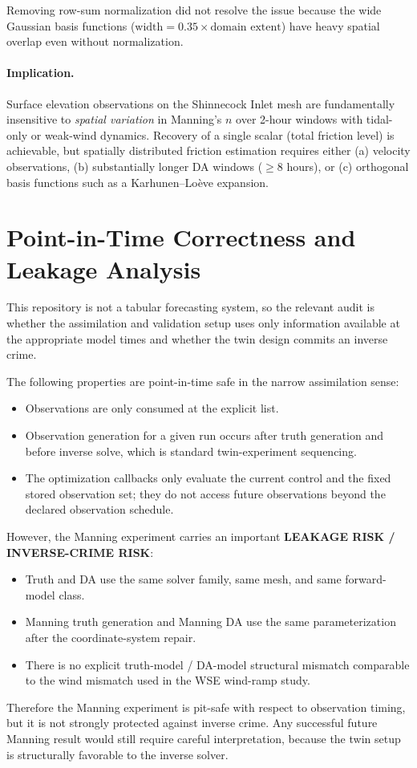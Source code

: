 \documentclass[11pt]{article}
\begin{document}
Removing row-sum normalization did not resolve the issue because the wide Gaussian basis functions ($\text{width} = 0.35 \times \text{domain extent}$) have heavy spatial overlap even without normalization.

\paragraph{Implication.} Surface elevation observations on the Shinnecock Inlet mesh are fundamentally insensitive to \emph{spatial variation} in Manning's $n$ over 2-hour windows with tidal-only or weak-wind dynamics. Recovery of a single scalar (total friction level) is achievable, but spatially distributed friction estimation requires either (a) velocity observations, (b) substantially longer DA windows ($\ge 8$ hours), or (c) orthogonal basis functions such as a Karhunen--Lo\`eve expansion.

\section{Point-in-Time Correctness and Leakage Analysis}
This repository is not a tabular forecasting system, so the relevant audit is whether the assimilation and validation setup uses only information available at the appropriate model times and whether the twin design commits an inverse crime.

The following properties are point-in-time safe in the narrow assimilation sense:
\begin{itemize}
\item Observations are only consumed at the explicit  list.
\item Observation generation for a given run occurs after truth generation and before inverse solve, which is standard twin-experiment sequencing.
\item The optimization callbacks only evaluate the current control and the fixed stored observation set; they do not access future observations beyond the declared observation schedule.
\end{itemize}

However, the Manning experiment carries an important \textbf{LEAKAGE RISK / INVERSE-CRIME RISK}:
\begin{itemize}
\item Truth and DA use the same solver family, same mesh, and same forward-model class.
\item Manning truth generation and Manning DA use the same  parameterization after the coordinate-system repair.
\item There is no explicit truth-model / DA-model structural mismatch comparable to the wind mismatch used in the WSE wind-ramp study.
\end{itemize}
Therefore the Manning experiment is pit-safe with respect to observation timing, but it is not strongly protected against inverse crime. Any successful future Manning result would still require careful interpretation, because the twin setup is structurally favorable to the inverse solver.
\end{document}
